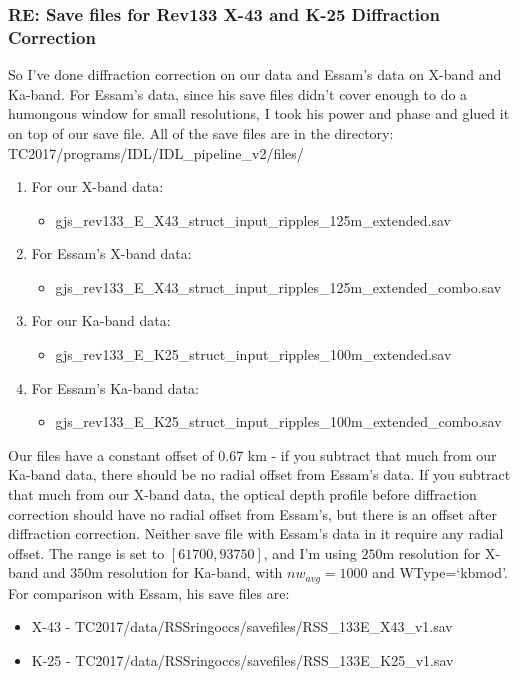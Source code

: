 \documentclass[crop=false,class=article,oneside]{standalone}
\begin{document}
\subsubsection{RE: Save files for Rev133 X-43 and K-25 Diffraction Correction}
So I’ve done diffraction correction on our data and Essam’s data on X-band and Ka-band. For Essam’s data, since his save files didn’t cover enough to do a humongous window for small resolutions, I took his power and phase and glued it on top of our save file. All of the save files are in the directory: TC2017/programs/IDL/IDL\_pipeline\_v2/files/
\begin{enumerate}
    \item For our X-band data:
    \begin{itemize}
        \item gjs\_rev133\_E\_X43\_struct\_input\_ripples\_125m\_extended.sav
    \end{itemize}
        \item For Essam’s X-band data:
    \begin{itemize}
        \item gjs\_rev133\_E\_X43\_struct\_input\_ripples\_125m\_extended\_combo.sav
    \end{itemize}
    \item For our Ka-band data:
    \begin{itemize}
        \item gjs\_rev133\_E\_K25\_struct\_input\_ripples\_100m\_extended.sav 
    \end{itemize}
    \item For Essam’s Ka-band data:
    \begin{itemize}
        \item gjs\_rev133\_E\_K25\_struct\_input\_ripples\_100m\_extended\_combo.sav
    \end{itemize}
\end{enumerate}
Our files have a constant offset of 0.67 km - if you subtract that much from our Ka-band data, there should be no radial offset from Essam’s data. If you subtract that much from our X-band data, the optical depth profile before diffraction correction should have no radial offset from Essam's, but there is an offset after diffraction correction. Neither save file with Essam’s data in it require any radial offset. The range is set to $[61700, 93750]$, and I’m using $250$m resolution for X-band and $350$m resolution for Ka-band, with $nw_{avg} = 1000$ and WType=‘kbmod'. For comparison with Essam, his save files are:
\begin{itemize}
    \item X-43 - TC2017/data/RSSringoccs/savefiles/RSS\_133E\_X43\_v1.sav
    \item K-25 - TC2017/data/RSSringoccs/savefiles/RSS\_133E\_K25\_v1.sav
\end{itemize}
\end{document}
